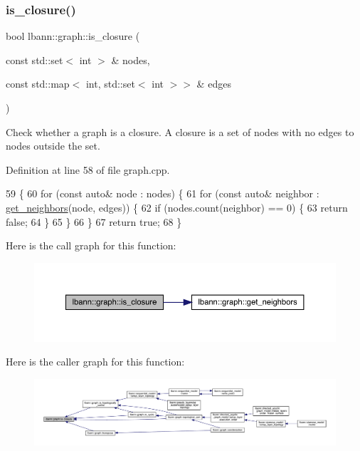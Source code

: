 \subsubsection{\texorpdfstring{is\+\_\+closure()}{is\_closure()}}
{\footnotesize\ttfamily bool lbann\+::graph\+::is\+\_\+closure (\begin{DoxyParamCaption}\item[{const std\+::set$<$ int $>$ \&}]{nodes,  }\item[{const std\+::map$<$ int, std\+::set$<$ int $>$$>$ \&}]{edges }\end{DoxyParamCaption})}

Check whether a graph is a closure. A closure is a set of nodes with no edges to nodes outside the set. 

Definition at line 58 of file graph.\+cpp.


\begin{DoxyCode}
59                                                       \{
60   \textcolor{keywordflow}{for} (\textcolor{keyword}{const} \textcolor{keyword}{auto}& node : nodes) \{
61     \textcolor{keywordflow}{for} (\textcolor{keyword}{const} \textcolor{keyword}{auto}& neighbor : \hyperlink{namespacelbann_1_1graph_ad305e0d104d25d9cb1e63a4b93c0847c}{get\_neighbors}(node, edges)) \{
62       \textcolor{keywordflow}{if} (nodes.count(neighbor) == 0) \{
63         \textcolor{keywordflow}{return} \textcolor{keyword}{false};
64       \}
65     \}
66   \}
67   \textcolor{keywordflow}{return} \textcolor{keyword}{true};
68 \}
\end{DoxyCode}
Here is the call graph for this function\+:\nopagebreak
\begin{figure}[H]
\begin{center}
\leavevmode
\includegraphics[width=350pt]{namespacelbann_1_1graph_ac9c1819b38f8bc514ab24ac8778f840b_cgraph}
\end{center}
\end{figure}
Here is the caller graph for this function\+:\nopagebreak
\begin{figure}[H]
\begin{center}
\leavevmode
\includegraphics[width=350pt]{namespacelbann_1_1graph_ac9c1819b38f8bc514ab24ac8778f840b_icgraph}
\end{center}
\end{figure}
\mbox{\label{namespacelbann_1_1graph_a7cb66f3455c79ca9c959bcf2c36a92eb}} 
